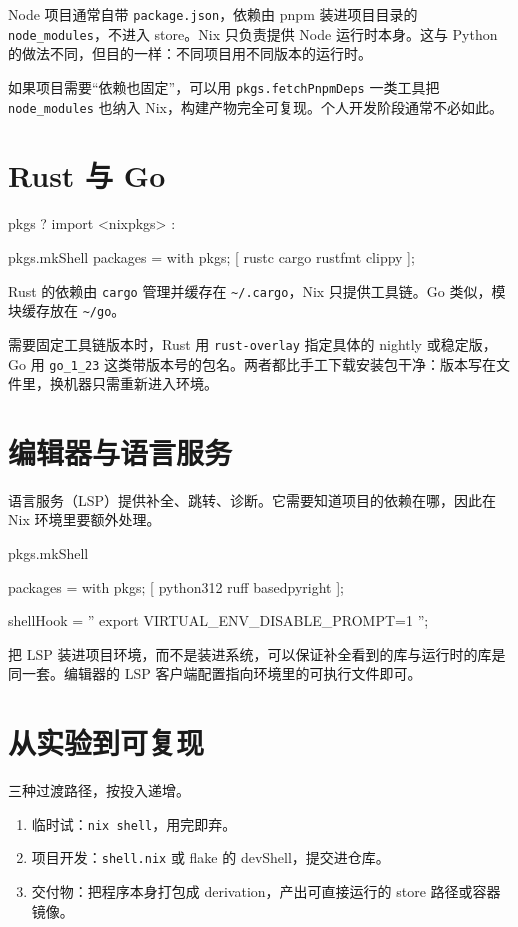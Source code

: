 Node 项目通常自带 \texttt{package.json}，依赖由 pnpm 装进项目目录的 \texttt{node\_\allowbreak{}modules}，不进入 store。Nix 只负责提供 Node 运行时本身。这与 Python 的做法不同，但目的一样：不同项目用不同版本的运行时。

如果项目需要“依赖也固定”，可以用 \texttt{pkgs.\allowbreak{}fetchPnpmDeps} 一类工具把 \texttt{node\_\allowbreak{}modules} 也纳入 Nix，构建产物完全可复现。个人开发阶段通常不必如此。

\section{Rust 与 Go}

\begin{nixcode}
{ pkgs ? import <nixpkgs> {} }:

pkgs.mkShell {
  packages = with pkgs; [
    rustc cargo rustfmt clippy
  ];
}
\end{nixcode}

Rust 的依赖由 \texttt{cargo} 管理并缓存在 \texttt{\textasciitilde/.cargo}，Nix 只提供工具链。Go 类似，模块缓存放在 \texttt{\textasciitilde/go}。

需要固定工具链版本时，Rust 用 \texttt{rust-overlay} 指定具体的 nightly 或稳定版，Go 用 \texttt{go\_1\_23} 这类带版本号的包名。两者都比手工下载安装包干净：版本写在文件里，换机器只需重新进入环境。

\section{编辑器与语言服务}

语言服务（LSP）提供补全、跳转、诊断。它需要知道项目的依赖在哪，因此在 Nix 环境里要额外处理。

\begin{nixcode}
pkgs.mkShell {
  packages = with pkgs; [ python312 ruff basedpyright ];

  shellHook = ''
    export VIRTUAL_ENV_DISABLE_PROMPT=1
  '';
}
\end{nixcode}

把 LSP 装进项目环境，而不是装进系统，可以保证补全看到的库与运行时的库是同一套。编辑器的 LSP 客户端配置指向环境里的可执行文件即可。

\section{从实验到可复现}

三种过渡路径，按投入递增。

\begin{enumerate}
  \item 临时试：\texttt{nix shell}，用完即弃。
  \item 项目开发：\texttt{shell.nix} 或 flake 的 devShell，提交进仓库。
  \item 交付物：把程序本身打包成 derivation，产出可直接运行的 store 路径或容器镜像。
\end{enumerate}

